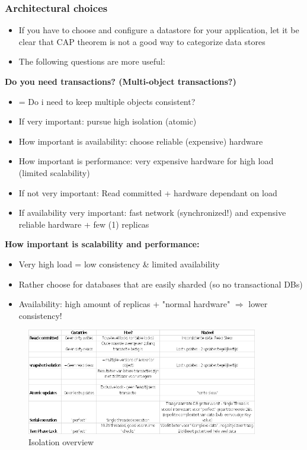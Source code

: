 \documentclass{article}
\begin{document}
\subsubsection{Architectural choices}

\begin{itemize}
    \item If you have to choose and configure a datastore for your application, let it be clear that CAP theorem is not a good way to categorize data stores 
    \item The following questions are more useful:
\end{itemize}

\textbf{Do you need transactions? (Multi-object transactions?)}

\begin{itemize}
    \item = Do i need to keep multiple objects consistent?
    \item If very important: pursue high isolation (atomic)
    \item How important is availability: choose reliable (expensive) hardware
    \item How important is performance: very expensive hardware for high load (limited scalability)
    \item If not very important: Read committed + hardware dependant on load
    \item If availability very important: fast network (synchronized!) and expensive reliable hardware + few (1) replicas
\end{itemize}

\textbf{How important is scalability and performance:}

\begin{itemize}
    \item Very high load = low consistency \& limited availability
    \item Rather choose for databases that are easily sharded (so no transactional DBs)
    \item Availability: high amount of replicas + "normal hardware" $\Rightarrow$ lower consistency!
\end{itemize}

\begin{figure}[H]
    \centering
    \includegraphics[width=0.9\textwidth]{overview-isolation.png}
    \caption{Isolation overview}
\end{figure}
\end{document}
